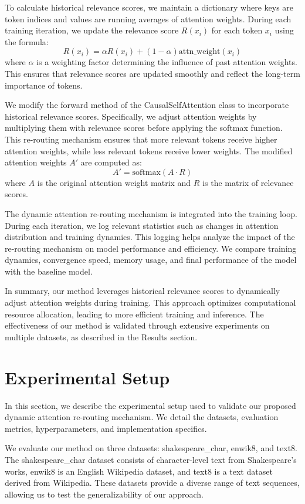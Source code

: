 \documentclass{article} %
\begin{document}
To calculate historical relevance scores, we maintain a dictionary where keys are token indices and values are running averages of attention weights. During each training iteration, we update the relevance score \( R(x_i) \) for each token \( x_i \) using the formula:
\[
R(x_i) = \alpha R(x_i) + (1 - \alpha) \text{attn\_weight}(x_i)
\]
where \( \alpha \) is a weighting factor determining the influence of past attention weights. This ensures that relevance scores are updated smoothly and reflect the long-term importance of tokens.

We modify the forward method of the CausalSelfAttention class to incorporate historical relevance scores. Specifically, we adjust attention weights by multiplying them with relevance scores before applying the softmax function. This re-routing mechanism ensures that more relevant tokens receive higher attention weights, while less relevant tokens receive lower weights. The modified attention weights \( A' \) are computed as:
\[
A' = \text{softmax}(A \cdot R)
\]
where \( A \) is the original attention weight matrix and \( R \) is the matrix of relevance scores.

The dynamic attention re-routing mechanism is integrated into the training loop. During each iteration, we log relevant statistics such as changes in attention distribution and training dynamics. This logging helps analyze the impact of the re-routing mechanism on model performance and efficiency. We compare training dynamics, convergence speed, memory usage, and final performance of the model with the baseline model.

In summary, our method leverages historical relevance scores to dynamically adjust attention weights during training. This approach optimizes computational resource allocation, leading to more efficient training and inference. The effectiveness of our method is validated through extensive experiments on multiple datasets, as described in the Results section.

\section{Experimental Setup}
\label{sec:experimental}

In this section, we describe the experimental setup used to validate our proposed dynamic attention re-routing mechanism. We detail the datasets, evaluation metrics, hyperparameters, and implementation specifics.

We evaluate our method on three datasets: shakespeare\_char, enwik8, and text8. The shakespeare\_char dataset consists of character-level text from Shakespeare's works, enwik8 is an English Wikipedia dataset, and text8 is a text dataset derived from Wikipedia. These datasets provide a diverse range of text sequences, allowing us to test the generalizability of our approach.
\end{document}
